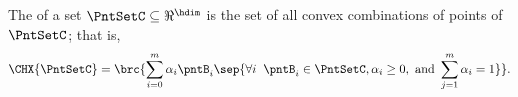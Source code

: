 \begin{defn}
        The  of a set $\PntSetC \subseteq
        \Re^\hdim$ is the set of all convex combinations of points of
        $\PntSetC$; that is,
        \[
        \CHX{ \PntSetC} = \brc{\sum_{i=0}^m \alpha_i \pntB_i\sep{
              \forall i \;\;\pntB_i \in \PntSetC, \alpha_i \geq 0,
              \text{ and } \sum_{j=1}^m \alpha_i =1}}.
        \]
    \end{defn}
